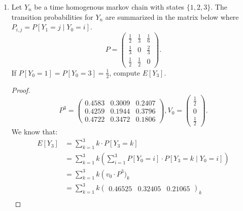 \documentclass[a4paper]{article}
\begin{document}
\begin{enumerate}
\begin{proof}
    $\{X_n\} $ is a markov chain because at every time $X_n$,  
    \begin{align*}
      P[X_n = S_j \mid X_{n-1} = S_{j_{n-1}}, \ldots, X_{0} = S_{j_{0}}] &= P[X_n = S_j \mid X_{n-1} = S_{j_{n-1}}]\\ &= \begin{cases}
      \frac{n-j_{n-1}}{n}, S_{j} = S_{j_{n-1}} + 1 \\
      \frac{j_{n-1}}{n}, S_{j} = S_{j_{n-1}} - 1 \\
      0, \text{ otherwise}
    \end{cases}
    .\end{align*} By construction, the probability of the next state is only dependent on the previous state. Thus, since it's a stochastic process (since $X_k$ are timesteps) with the above property, then  $\{X_n\} $ is a markov chain. 
  \end{proof}
\item  Let $Y_n$ be a time homogenous markov chain with states  $\{1,2,3\}$. The transition probabilities for $Y_n$ are summarized in the matrix below where  $P_{i,j} = P[Y_1 = j \mid  Y_0 = i]$. 
  \[
    P = \begin{pmatrix}
\frac{1}{2} & \frac{1}{3} & \frac{1}{6} \\
\frac{1}{3} & 0 & \frac{2}{3} \\
\frac{1}{2} & \frac{1}{2} & 0
\end{pmatrix}
  .\] 
  If $P[Y_0=1] = P[Y_0 =3] = \frac{1}{2}$, compute $E[Y_3]$. 
  \begin{proof}
   \[
   P^3 = \begin{pmatrix}
0.4583 & 0.3009 & 0.2407 \\
0.4259 & 0.1944 & 0.3796 \\
0.4722 & 0.3472 & 0.1806
\end{pmatrix}, V_0 = \begin{pmatrix} 
\frac{1}{2}\\
0 \\
\frac{1}{2}
\end{pmatrix} 
   .\] 
   We know that:
   \begin{align*}
     E[Y_3] &= \sum_{k=1}^{3} k \cdot P[Y_3 = k] \\
            &= \sum_{k=1}^{3} k (\sum_{i=1}^{3} P[Y_0=i] \cdot P[Y_3=k\mid Y_0 = i])\\
            &= \sum_{k=1}^{3} k \left(v_0 \cdot P^{3})_{k}  \\
            &=  \sum_{k=1}^{3} k \begin{pmatrix} 0.46525 & 0.32405 & 0.21065 \end{pmatrix}_{k}\\

\end{align*}
\end{proof}
\end{enumerate}
\end{document}
